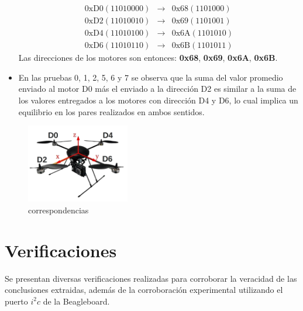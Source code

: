 \documentclass[main]{subfiles}
\begin{document}
\begin{itemize}
\begin{eqnarray}
\mathrm{0xD0} (11010000) &\longrightarrow &\mathrm{0x68} (1101000) \\
\mathrm{0xD2} (11010010) &\longrightarrow &\mathrm{0x69} (1101001) \\
\mathrm{0xD4} (11010100) &\longrightarrow &\mathrm{0x6A} (1101010) \\
\mathrm{0xD6} (11010110) &\longrightarrow &\mathrm{0x6B} (1101011) 
\end{eqnarray}
Las direcciones de los motores son entonces: \textbf{0x68}, \textbf{0x69}, \textbf{0x6A}, \textbf{0x6B}.
\item En las pruebas 0, 1, 2, 5, 6 y 7 se observa que la suma del valor promedio enviado al motor D0 m\'as el enviado a la direcci\'on D2 es similar a la suma de los valores entregados a los motores con direcci\'on D4 y D6, lo cual implica un equilibrio en los pares realizados en ambos sentidos. 
\end{itemize}

\begin{figure}[h!]
	\centering
	\includegraphics[width=0.4\textwidth]{./pics_sniffer/correspondencias.jpg}
	\caption{correspondencias}
	\label{fig:correspondencias}
\end{figure}

\section{Verificaciones}
Se presentan diversas verificaciones realizadas para corroborar la veracidad de las conclusiones extraidas, adem\'as de la corroboraci\'on experimental utilizando el puerto $i^2c$ de la Beagleboard.\\
\end{document}
